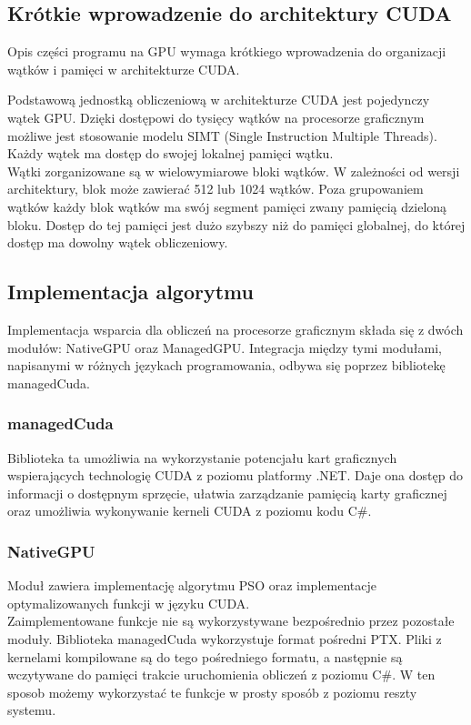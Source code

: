 \documentclass[12pt, twoside, openany, abstract=on]{report}
\theoremstyle{definition}
\begin{document}
\subsection{Krótkie wprowadzenie do architektury CUDA}
Opis części programu na GPU wymaga krótkiego wprowadzenia do organizacji wątków i pamięci w architekturze CUDA.

Podstawową jednostką obliczeniową 
w architekturze CUDA jest pojedynczy wątek GPU. Dzięki dostępowi do tysięcy wątków na procesorze graficznym możliwe jest stosowanie modelu SIMT (Single Instruction Multiple Threads). Każdy wątek ma dostęp do swojej lokalnej pamięci wątku. \\
Wątki zorganizowane są w wielowymiarowe bloki wątków. W zależności od wersji architektury, blok może zawierać 512 lub 1024 wątków. Poza grupowaniem wątków każdy blok wątków ma swój segment pamięci zwany pamięcią dzieloną bloku. Dostęp do tej pamięci jest dużo szybszy niż do pamięci globalnej, do której dostęp ma dowolny wątek obliczeniowy. \cite{CudaProgGuide}

\subsection{Implementacja algorytmu}
Implementacja wsparcia dla obliczeń na procesorze graficznym składa się z dwóch modułów: NativeGPU oraz ManagedGPU. Integracja między tymi modułami, napisanymi w różnych językach programowania, odbywa się poprzez bibliotekę managedCuda.

\subsubsection{managedCuda}
Biblioteka ta umożliwia na wykorzystanie potencjału kart graficznych wspierających technologię CUDA z poziomu platformy .NET. Daje ona dostęp do informacji o dostępnym sprzęcie, ułatwia zarządzanie pamięcią karty graficznej oraz umożliwia wykonywanie kerneli CUDA z poziomu kodu C\#. 

\subsubsection{NativeGPU}
Moduł zawiera implementację algorytmu PSO oraz implementacje optymalizowanych funkcji w języku CUDA. \\

Zaimplementowane funkcje nie są wykorzystywane bezpośrednio przez pozostałe moduły. Biblioteka managedCuda wykorzystuje format pośredni PTX. Pliki z kernelami kompilowane są do tego pośredniego formatu, a następnie są wczytywane do pamięci trakcie uruchomienia obliczeń z poziomu C\#. W ten sposob możemy wykorzystać te funkcje w prosty sposób z poziomu reszty systemu. \\
\end{document}
